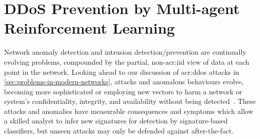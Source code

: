 \chapter{DDoS Prevention by Multi-agent Reinforcement Learning}\label{chap:ddos-rl}
Network anomaly detection and intrusion detection/prevention are continually evolving problems, compounded by the partial, non-\gls{acr:iid} view of data at each point in the network.
Looking ahead to our discussion of \gls{acr:ddos} attacks in \cref{sec:problems-in-modern-networks}, attacks and anomalous behaviours evolve, becoming more sophisticated or employing new vectors to harm a network or system's confidentiality, integrity, and availability without being detected~\parencite{DBLP:journals/comsur/BhuyanBK14}.
These attacks and anomalies have measurable consequences and symptoms which allow a skilled analyst to infer new signatures for detection by signature-based classifiers, but unseen attacks may only be defended against after-the-fact.



